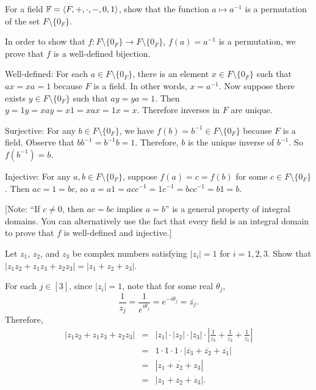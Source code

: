 \begin{problem}[Golan 12]
For a field $\mathbb{F} = \langle F,+,\cdot, -, 0, 1\rangle$, 
show that the function $a \mapsto a^{-1}$ is a 
permutation of the set $F \setminus \{0_F\}$.
\end{problem}
\smallskip
\begin{solution}

In order to show that $f:F\setminus \{0_F\}\rightarrow F\setminus \{0_F\}$, $f(a)=a^{-1}$ is a permutation, we prove that $f$ is a well-defined bijection. 

Well-defined: For each $a\in F\setminus \{0_F\}$, there is an element $x\in F\setminus \{0_F\}$ such that $ax=xa=1$ because $F$ is a field. In other words, $x=a^{-1}$. Now suppose there exists $y\in  F\setminus \{0_F\}$ such that $ay=ya=1$. Then $y = 1y = xay = x1 = xax = 1x = x$. Therefore inverses in $F$ are unique. 

Surjective: For any $b\in F\setminus \{0_F\}$, we have $f(b)=b^{-1}\in F\setminus \{0_F\}$ because $F$ is a field. Observe that $bb^{-1}=b^{-1}b=1$. Therefore, $b$ is the unique inverse of $b^{-1}$. So $f(b^{-1}) = b$. 

Injective: For any $a,b\in F\setminus \{0_F\}$, suppose $f(a) = c = f(b)$ for some $c\in F\setminus \{0_F\}$. Then $ac = 1 =bc $, so $a = a1 = acc^{-1} = 1c^{-1} = bcc^{-1} = b1 = b$.

[Note: ``If $c\neq 0$, then $ac = bc$ implies $a=b$'' is a general property of integral domains. You can alternatively use the fact that every field is an integral domain to prove that $f$ is well-defined and injective.]

\end{solution}
\probskip




\begin{problem}[Golan 16]
Let $z_1$, $z_2$, and $z_3$ be complex numbers satisfying 
$|z_i| = 1$ for $i = 1, 2, 3$. Show that 
$|z_1 z_2 + z_1 z_3 + z_2 z_3 | = |z_1 + z_2 + z_3|$.
\end{problem}
\smallskip
\begin{solution}
For each $j \in [3]$, since $|z_i|=1$, note that for some real $\theta_j$,
$$\frac{1}{z_j}  = \frac{1}{e^{i\theta_j}} = e^{-i\theta_j}= \overline{z_j}.$$
Therefore,
\begin{eqnarray*}
|z_1 z_2 + z_1 z_3 + z_2 z_3 | & = & |z_1| \cdot |z_2| \cdot |z_3| \cdot \left|\frac{1}{z_3} + \frac{1}{z_2} + \frac{1}{z_1}\right|\\
& = & 1 \cdot 1 \cdot 1 \cdot | \overline{z_3} + \overline{z_2} + \overline{z_1} | \\
& = &  | \overline{z_1 + z_2 + z_3} | \\
& = & |z_1 + z_2 + z_3 |.
\end{eqnarray*}

\end{solution}
\probskip




